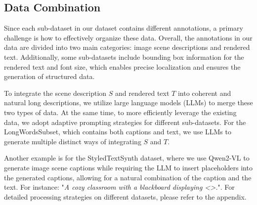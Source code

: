 




\subsection{Data Combination}  

Since each sub-dataset in our dataset contains different annotations, a primary challenge is how to effectively organize these data. Overall, the annotations in our data are divided into two main categories: image scene descriptions and rendered text. Additionally, some sub-datasets include bounding box information for the rendered text and font size, which enables precise localization and ensures the generation of structured data.

To integrate the scene description $S$ and rendered text $T$ into coherent and natural long descriptions, we utilize large language models (LLMs) to merge these two types of data. At the same time, to more efficiently leverage the existing data, we adopt adaptive prompting strategies for different sub-datasets. For the LongWordsSubset, which contains both captions and text, we use LLMs to generate multiple distinct ways of integrating $S$ and $T$.

Another example is for the StyledTextSynth dataset, where we use Qwen2-VL to generate image scene captions while requiring the LLM to insert placeholders into the generated captions, allowing for a natural combination of the caption and the text. 
For instance: "\textit{A cozy classroom with a blackboard displaying <>.}".
For detailed processing strategies on different datasets, please refer to the appendix.


